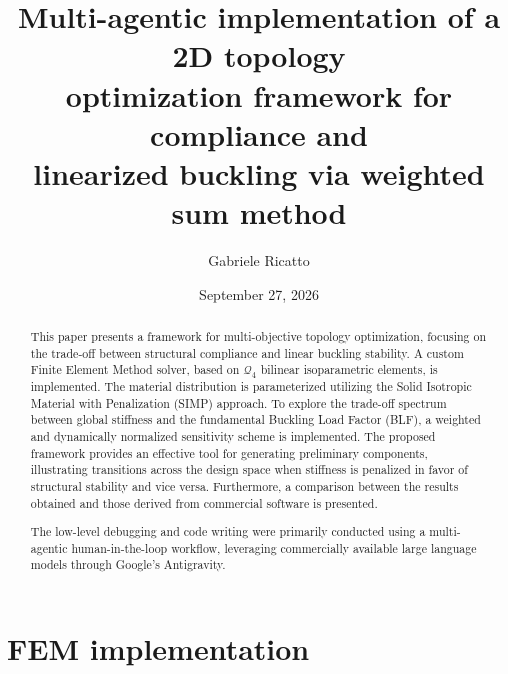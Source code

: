 \documentclass{article}
\title{Multi-agentic implementation of a 2D topology \\ optimization framework for compliance and \\ linearized buckling via weighted sum method}
\author{Gabriele Ricatto}
\date{September 27, 2026}
\begin{document}
\maketitle

\begin{abstract}
This paper presents a framework for multi-objective topology optimization, focusing on the trade-off between structural compliance and linear buckling stability. A custom Finite Element Method solver, based on $\mathcal{Q}_4$ bilinear isoparametric elements, is implemented. The material distribution is parameterized utilizing the Solid Isotropic Material with Penalization (SIMP) approach. To explore the trade-off spectrum between global stiffness and the fundamental Buckling Load Factor (BLF), a weighted and dynamically normalized sensitivity scheme is implemented. The proposed framework provides an effective tool for generating preliminary components, illustrating transitions across the design space when stiffness is penalized in favor of structural stability and vice versa. Furthermore, a comparison between the results obtained and those derived from commercial software is presented.

The low-level debugging and code writing were primarily conducted using a multi-agentic human-in-the-loop workflow, leveraging commercially available large language models through Google's Antigravity.
\end{abstract}

\newpage

\section{FEM implementation}
\end{document}
